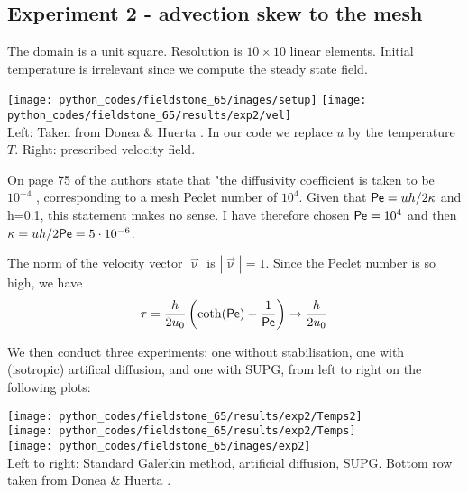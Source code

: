 \subsection*{Experiment 2 - advection skew to the mesh}

The domain is a unit square. Resolution is $10\times10$ linear elements. Initial temperature is 
irrelevant since we compute the steady state field. 

\begin{center}
\texttt{[image: python\_codes/fieldstone\_65/images/setup]}
\texttt{[image: python\_codes/fieldstone\_65/results/exp2/vel]}\\
{\captionfont Left: Taken from Donea \& Huerta \cite{dohu03}. In our code we replace $u$ by the 
temperature $T$. Right: prescribed velocity field.}
\end{center}

\begin{remark}
On page 75 of \cite{dohu03} the authors state that 
"the diffusivity coefficient is taken to be $10^{-4}$ , 
corresponding to a mesh Peclet number of $10^4$. 
Given that ${\mathsf{Pe}}=u h/2\kappa$ and h=0.1, this statement makes no sense.
I have therefore chosen ${\mathsf{Pe}}=10^4$ and then 
$\kappa=uh/2{\mathsf{Pe}} = 5\cdot10^{-6}$.
\end{remark}

The norm of the velocity vector $\vec{\upnu}$ is $|\vec{\upnu}|=1$. 
Since the Peclet number is so high, we have 
\[
\tau = \frac{h}{2 u_0} \left( \coth ({\mathsf{Pe}}) -\frac{1}{{\mathsf{Pe}}} \right) \rightarrow 
\frac{h}{2 u_0} 
\]

We then conduct three experiments: one without stabilisation, one with (isotropic) artifical diffusion, and 
one with SUPG, from left to right on the following plots:

\begin{center}
\texttt{[image: python\_codes/fieldstone\_65/results/exp2/Temps2]}\\
\texttt{[image: python\_codes/fieldstone\_65/results/exp2/Temps]}\\
\texttt{[image: python\_codes/fieldstone\_65/images/exp2]}\\
{\captionfont Left to right: Standard Galerkin method, artificial diffusion, SUPG. 
Bottom row taken from Donea \& Huerta \cite{dohu03}. }
\end{center}



